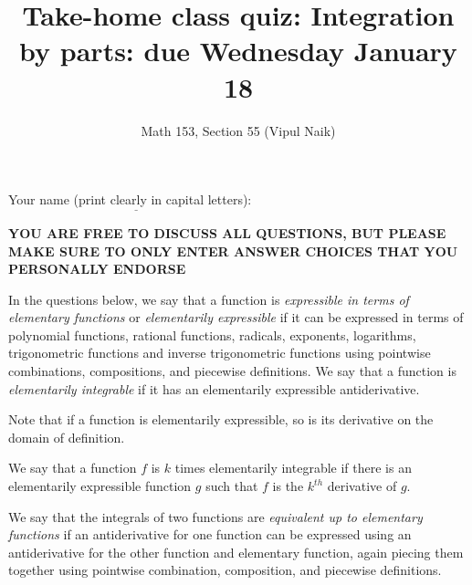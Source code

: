 \documentclass[10pt]{amsart}
\title{Take-home class quiz: Integration by parts: due Wednesday January 18}
\author{Math 153, Section 55 (Vipul Naik)}
\begin{document}
\maketitle

Your name (print clearly in capital letters): $\underline{\qquad\qquad\qquad\qquad\qquad\qquad\qquad\qquad\qquad\qquad}$

{\bf YOU ARE FREE TO DISCUSS ALL QUESTIONS, BUT PLEASE MAKE SURE TO
ONLY ENTER ANSWER CHOICES THAT YOU PERSONALLY ENDORSE}

In the questions below, we say that a function is {\em expressible in
terms of elementary functions} or {\em elementarily expressible} if it
can be expressed in terms of polynomial functions, rational functions,
radicals, exponents, logarithms, trigonometric functions and inverse
trigonometric functions using pointwise combinations, compositions,
and piecewise definitions. We say that a function is {\em elementarily
integrable} if it has an elementarily expressible antiderivative.

Note that if a function is elementarily expressible, so is its
derivative on the domain of definition.

We say that a function $f$ is $k$ times elementarily integrable if
there is an elementarily expressible function $g$ such that $f$ is the
$k^{th}$ derivative of $g$.

We say that the integrals of two functions are {\em equivalent up to
elementary functions} if an antiderivative for one function can be
expressed using an antiderivative for the other function and
elementary function, again piecing them together using pointwise
combination, composition, and piecewise definitions.
\end{document}

